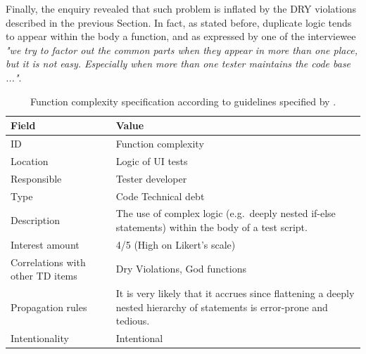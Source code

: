     Finally, the enquiry revealed that such problem is inflated by the DRY violations described in the previous Section. In fact, as stated before, duplicate logic tends to appear within the body a function, and as expressed by one of the interviewee \textit{"we try to factor out the common parts when they appear in more than one place, but it is not easy. Especially when more than one tester maintains the code base ..."}.




	\begin{table}[!htbp]
		\centering
		\tabulinesep=1.2mm
		\begin{tabu} to \textwidth {|X|X[3]|}

			\hline
			\textbf{Field} & \textbf{Value} \\
			\hline

			ID & Function complexity \\
			\hline

			Location & Logic of UI tests \\
			\hline

			Responsible & Tester developer \\
			\hline

			Type & Code Technical debt \\
			\hline

			Description & The use of complex logic (e.g.\ deeply nested if-else statements) within the body of a test script.\\
			\hline



			Interest amount &  4/5 (High on Likert's scale) \\
			\hline



			Correlations with other TD items & Dry Violations, God functions\\
			\hline



			Propagation rules & It is very likely that it accrues since flattening a deeply nested hierarchy of statements is error-prone and tedious.\\
			\hline

			Intentionality & Intentional \\
			\hline

		\end{tabu}
		\label{tab:res-function-complexity}
		\caption[Function complexity specification]{Function complexity specification according to guidelines specified by \cite{mapping_study_td}.}
	\end{table}



